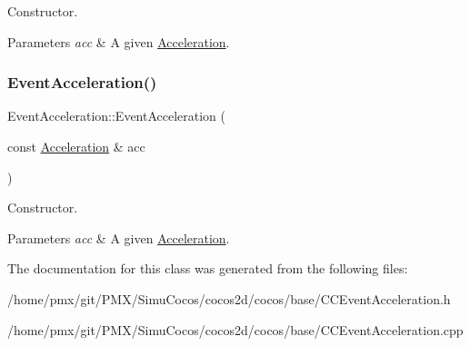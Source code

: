 Constructor.


\begin{DoxyParams}{Parameters}
{\em acc} & A given \hyperlink{classAcceleration}{Acceleration}. \\
\hline
\end{DoxyParams}
\mbox{\label{classEventAcceleration_a5fd91f5b2cdac2a55c74cabb44e3398c}} 
\subsubsection{\texorpdfstring{Event\+Acceleration()}{EventAcceleration()}\hspace{0.1cm}{\footnotesize\ttfamily [2/2]}}
{\footnotesize\ttfamily Event\+Acceleration\+::\+Event\+Acceleration (\begin{DoxyParamCaption}\item[{const \hyperlink{classAcceleration}{Acceleration} \&}]{acc }\end{DoxyParamCaption})}

Constructor.


\begin{DoxyParams}{Parameters}
{\em acc} & A given \hyperlink{classAcceleration}{Acceleration}. \\
\hline
\end{DoxyParams}


The documentation for this class was generated from the following files\+:\begin{DoxyCompactItemize}
\item 
/home/pmx/git/\+P\+M\+X/\+Simu\+Cocos/cocos2d/cocos/base/C\+C\+Event\+Acceleration.\+h\item 
/home/pmx/git/\+P\+M\+X/\+Simu\+Cocos/cocos2d/cocos/base/C\+C\+Event\+Acceleration.\+cpp\end{DoxyCompactItemize}
